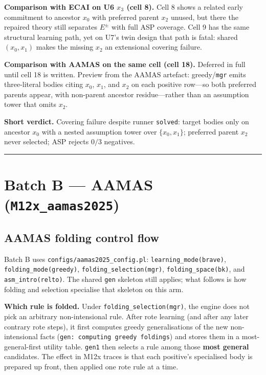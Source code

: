 \documentclass[11pt]{article}
\begin{document}
\textbf{Comparison with ECAI on U6 \(x_3\) (cell 8).} Cell 8 shows a related early commitment to ancestor \(x_0\) with preferred parent \(x_2\) unused, but there the repaired theory still separates \(E^\pm\) with full ASP coverage. Cell 9 has the same structural learning path, yet on U7's twin design that path is fatal: shared \((x_0,x_1)\) makes the missing \(x_2\) an extensional covering failure.

\textbf{Comparison with AAMAS on the same cell (cell 18).} Deferred in full until cell 18 is written. Preview from the AAMAS artefact: greedy/\texttt{mgr} emits three-literal bodies citing \(x_0\), \(x_1\), and \(x_2\) on each positive row---so both preferred parents appear, with non-parent ancestor residue---rather than an assumption tower that omits \(x_2\).

\textbf{Short verdict.} Covering failure despite runner \texttt{solved}: target bodies only on ancestor \(x_0\) with a nested assumption tower over \(\{x_0,x_1\}\); preferred parent \(x_2\) never selected; ASP rejects \(0/3\) negatives.

\medskip\hrule\medskip

\section{Batch B --- AAMAS (\texttt{M12x\_aamas2025})}

\subsection{AAMAS folding control flow}

Batch B uses \texttt{configs/aamas2025\_config.pl}: \texttt{learning\_mode(brave)}, \texttt{folding\_mode(greedy)}, \texttt{folding\_selection(mgr)}, \texttt{folding\_space(bk)}, and \texttt{asm\_intro(relto)}. The shared \texttt{gen} skeleton still applies; what follows is how folding and selection specialise that skeleton on this arm.

\textbf{Which rule is folded.} Under \texttt{folding\_selection(mgr)}, the engine does not pick an arbitrary non-intensional rule. After rote learning (and after any later contrary rote steps), it first computes greedy generalisations of the new non-intensional facts (\texttt{gen: computing greedy foldings}) and stores them in a most-general-first utility table. \texttt{gen1} then selects a rule among those \textbf{most general} candidates. The effect in M12x traces is that each positive's specialised body is prepared up front, then applied one rote rule at a time.
\end{document}
